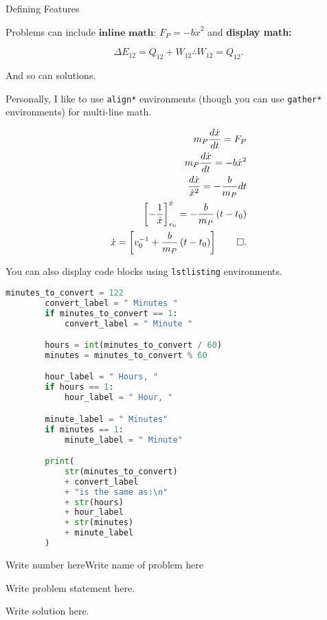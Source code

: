 \begin{hwkProblem}{2}{Defining Features}
		
	Problems can include \( \textbf{inline math: } F_{P} = - b \dot{x}^{2} \) and \textbf{display math:}

	\[
		\Delta E_{12} = Q_{12} + W_{12} \therefore W_{12} = Q_{12}
	.\]
	
	\hwkSol

	And so can solutions.

	Personally, I like to use \lstinline{align*} environments (though you can use \lstinline{gather*} environments) for multi-line math.

	\begin{align*}
		m_{P} \frac{d\dot{x}}{dt}                             = F_{P}                                     \\
		m_{P} \frac{d\dot{x}}{dt}                             = -b\dot{x}^{2}                             \\
		\frac{d\dot{x}}{\dot{x}^2}                            = - \frac{b}{m_{P}} dt                      \\
		\left[ - \frac{1}{\dot{x}} \right]^{\dot{x}}_{v_{0}}  = - \frac{b}{m_{P}}\left( t - t_{0} \right) \\
		\dot{x}                                               = \left[ v_{0}^{-1} + \frac{b}{m_{P}} \left( t - t_{0} \right) \right] \qed
		.\end{align*}

	You can also display code blocks using \lstinline{lstlisting} environments.

	\begin{lstlisting}[language=python]
		minutes_to_convert = 122
		convert_label = " Minutes "
		if minutes_to_convert == 1:
		    convert_label = " Minute "

		hours = int(minutes_to_convert / 60)
		minutes = minutes_to_convert % 60

		hour_label = " Hours, "
		if hours == 1:
		    hour_label = " Hour, "

		minute_label = " Minutes"
		if minutes == 1:
		    minute_label = " Minute"

		print(
		    str(minutes_to_convert)
		    + convert_label
		    + "is the same as:\n"
		    + str(hours)
		    + hour_label
		    + str(minutes)
		    + minute_label
		)
	\end{lstlisting}

\end{hwkProblem}

\begin{hwkProblem}{Write number here}{Write name of problem here}

	Write problem statement here.

	\hwkSol

	Write solution here.

\end{hwkProblem}


